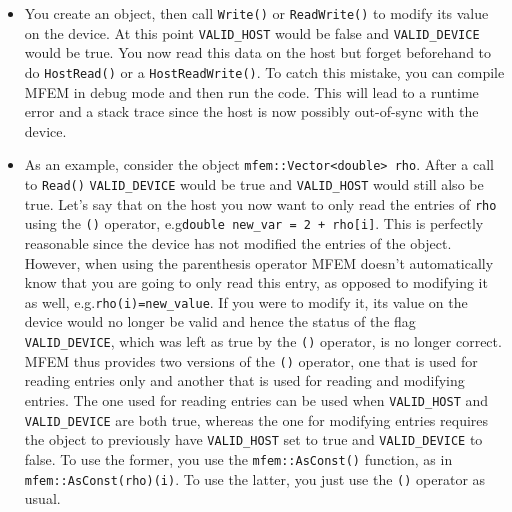 \documentclass[a4paper,11pt]{article}
\begin{document}
\begin{itemize}
    \item You create an object, then call \texttt{Write()} or \texttt{ReadWrite()} to modify its value on the device. At this point \texttt{VALID\_HOST} would be false and \texttt{VALID\_DEVICE} would be true. You now read this data on the host but forget beforehand to do \texttt{HostRead()} or a \texttt{HostReadWrite()}. To catch this mistake, you can compile MFEM in debug mode and then run the code. This will lead to a runtime error and a stack trace since the host is now possibly out-of-sync with the device. 
    
    \item As an example, consider the object \texttt{mfem::Vector<double> rho}. After a call to \texttt{Read()} \texttt{VALID\_DEVICE} would be true and \texttt{VALID\_HOST} would still also be true. Let's say that on the host you now want to only read the entries of \texttt{rho} using the \texttt{()} operator, e.g\@ \texttt{double new\_var = 2 + rho[i]}. This is perfectly reasonable since the device has not modified the entries of the object. However, when using the parenthesis operator MFEM doesn't automatically know that you are going to only read this entry, as opposed to modifying it as well, e.g.\@ \texttt{rho(i)=new\_value}. If you were to modify it, its value on the device would no longer be valid and hence the status of the flag \texttt{VALID\_DEVICE}, which was left as true by the \texttt{()} operator, is no longer correct. MFEM thus provides two versions of the \texttt{()} operator, one that is used for reading entries only and another that is used for reading and modifying entries. The one used for reading entries can be used when \texttt{VALID\_HOST} and \texttt{VALID\_DEVICE} are both true, whereas the one for modifying entries requires the object to previously have \texttt{VALID\_HOST} set to true and \texttt{VALID\_DEVICE} to false. To use the former, you use the \texttt{mfem::AsConst()} function, as in \texttt{mfem::AsConst(rho)(i)}. To use the latter, you just use the \texttt{()} operator as usual.
\end{itemize}    

\end{document}
